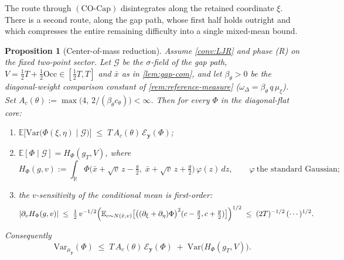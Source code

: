 \documentclass[reqno,final,11pt]{amsart}
\theoremstyle{plain}
\newtheorem{proposition}[theorem]{Proposition}
\theoremstyle{definition}
\theoremstyle{remark}
\newcommand{\R}{\mathbb R}
\newcommand{\E}{\mathbb E}
\newcommand{\cE}{\mathcal E}
\newcommand{\COcap}{(\mathrm{CO\text{-}Cap})}
\begin{document}
The route through $\COcap$ disintegrates along the retained coordinate $\xi$.
There is a second route, along the gap path, whose first half holds outright
and which compresses the entire remaining difficulty into a single mixed-mean
bound.

\begin{proposition}[Center-of-mass reduction]\label{prop:com-half}
Assume \cref{conv:LJR} and phase \textnormal{(R)} on the fixed two-point sector.
Let $\mathcal G$ be the $\sigma$-field of the gap path,
$V=\tfrac12T+\tfrac12\mathrm{Occ}\in[\tfrac12T,T]$ and $\bar x$ as in
\cref{lem:gap-com}, and let $\beta_\theta>0$ be the diagonal-weight comparison
constant of \cref{rem:reference-measure} ($\omega_\Delta=\beta_\theta\,q\,\mu_\xi$).
Set $A_c(\theta):=\max\bigl(4,\,2/(\beta_\theta c_\theta)\bigr)<\infty$. Then for
every $\Phi$ in the diagonal-flat core:
\begin{enumerate}
\item[$(\mathrm i)$] $\E\bigl[\mathrm{Var}\bigl(\Phi(\xi,\eta)\mid\mathcal G\bigr)\bigr]
\;\le\;T\,A_c(\theta)\,\cE_{\mathbf y}(\Phi)$;
\item[$(\mathrm{ii})$] $\E[\Phi\mid\mathcal G]=H_\Phi(g_T,V)$, where
\[
  H_\Phi(g,v):=\int_\R\Phi\bigl(\bar x+\sqrt v\,z-\tfrac g2,\;
  \bar x+\sqrt v\,z+\tfrac g2\bigr)\,\varphi(z)\,dz,
  \qquad\varphi\ \text{the standard Gaussian};
\]
\item[$(\mathrm{iii})$] the $v$-sensitivity of the conditional mean is
first-order:
\[
  |\partial_vH_\Phi(g,v)|\;\le\;\tfrac12\,v^{-1/2}
  \Bigl(\E_{c\sim N(\bar x,v)}\bigl[\bigl((\partial_\xi+\partial_\eta)\Phi\bigr)^2
  (c-\tfrac g2,c+\tfrac g2)\bigr]\Bigr)^{1/2}
  \;\le\;(2T)^{-1/2}\,(\cdots)^{1/2}.
\]
\end{enumerate}
Consequently
\begin{equation}\label{eq:com-reduction}
  \mathrm{Var}_{\mu_{\mathbf y}}(\Phi)\;\le\;T\,A_c(\theta)\,\cE_{\mathbf y}(\Phi)
  \;+\;\mathrm{Var}\bigl(H_\Phi(g_T,V)\bigr).
\end{equation}
\end{proposition}
\end{document}

